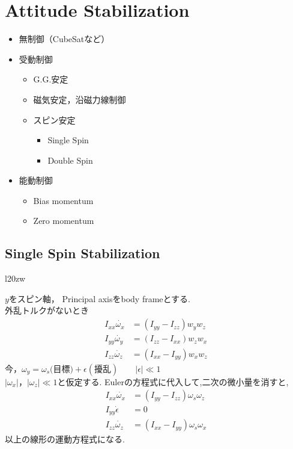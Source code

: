 \documentclass[class=article, crop=false, dvipdfmx]{standalone}
\begin{document}
\section{Attitude Stabilization}
\renewcommand{\labelitemi}{---}
\begin{itemize}
\item 無制御（CubeSatなど）
\item 受動制御
	\begin{itemize}
    \item G.G.安定
    \item 磁気安定，沿磁力線制御
    \item スピン安定
    	\begin{itemize}
        \item Single Spin
        \item Double Spin
        \end{itemize}
    \end{itemize}
\item 能動制御
	\begin{itemize}
    \item Bias momentum
    \item Zero momentum
    \end{itemize}
\end{itemize}
\renewcommand{\labelitemi}{\textbullet}


\subsection{Single Spin Stabilization}

\begin{wrapfigure}{l}{20zw}

\end{wrapfigure}

$y$をスピン軸，
Principal axisをbody frameとする.\\
外乱トルクがないとき
\begin{align}
I_{xx}\dot{\omega_x}&=(I_{yy}-I_{zz})w_yw_z\\
I_{yy}\dot{\omega_y}&=(I_{zz}-I_{xx})w_zw_x\\
I_{zz}\dot{\omega_z}&=(I_{xx}-I_{yy})w_xw_z
\end{align}
今，$\omega_y=\omega_s(\text{目標)}+\epsilon(\text{擾乱})\qquad |\epsilon| \ll 1$\\
$|\omega_x|，|\omega_z| \ll 1$と仮定する.
Eulerの方程式に代入して,二次の微小量を消すと,
\begin{align}
I_{xx}\dot{\omega_x} &= (I_{yy}-I_{zz})\omega_s\omega_z\\
I_{yy}\dot{\epsilon} &= 0 \\
I_{zz}\dot{\omega_z} &= (I_{xx}-I_{yy})\omega_s\omega_x
\end{align}
以上の線形の運動方程式になる.
\end{document}
